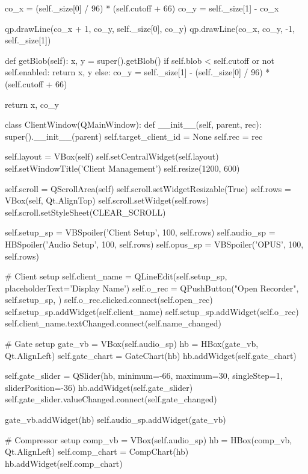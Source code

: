 \begin{pythoncode}
        co_x = (self._size[0] / 96) * (self.cutoff + 66)
        co_y = self._size[1] - co_x

        qp.drawLine(co_x + 1, co_y, self._size[0], co_y)
        qp.drawLine(co_x, co_y, -1, self._size[1])

    def getBlob(self):
        x, y = super().getBlob()
        if self.blob < self.cutoff or not self.enabled:
            return x, y
        else:
            co_y = self._size[1] - (self._size[0] / 96) * (self.cutoff + 66)

            return x, co_y


class ClientWindow(QMainWindow):
    def __init__(self, parent, rec):
        super().__init__(parent)
        self.target_client_id = None
        self.rec = rec

        self.layout = VBox(self)
        self.setCentralWidget(self.layout)
        self.setWindowTitle('Client Management')
        self.resize(1200, 600)

        self.scroll = QScrollArea(self)
        self.scroll.setWidgetResizable(True)
        self.rows = VBox(self, Qt.AlignTop)
        self.scroll.setWidget(self.rows)
        self.scroll.setStyleSheet(CLEAR_SCROLL)

        self.setup_sp = VBSpoiler('Client Setup', 100, self.rows)
        self.audio_sp = HBSpoiler('Audio Setup', 100, self.rows)
        self.opus_sp = VBSpoiler('OPUS', 100, self.rows)

        # Client setup
        self.client_name = QLineEdit(self.setup_sp, placeholderText='Display Name')
        self.o_rec = QPushButton("Open Recorder", self.setup_sp, )
        self.o_rec.clicked.connect(self.open_rec)
        self.setup_sp.addWidget(self.client_name)
        self.setup_sp.addWidget(self.o_rec)
        self.client_name.textChanged.connect(self.name_changed)

        # Gate setup
        gate_vb = VBox(self.audio_sp)
        hb = HBox(gate_vb, Qt.AlignLeft)
        self.gate_chart = GateChart(hb)
        hb.addWidget(self.gate_chart)

        self.gate_slider = QSlider(hb, minimum=-66, maximum=30, singleStep=1, sliderPosition=-36)
        hb.addWidget(self.gate_slider)
        self.gate_slider.valueChanged.connect(self.gate_changed)

        gate_vb.addWidget(hb)
        self.audio_sp.addWidget(gate_vb)

        # Compressor setup
        comp_vb = VBox(self.audio_sp)
        hb = HBox(comp_vb, Qt.AlignLeft)
        self.comp_chart = CompChart(hb)
        hb.addWidget(self.comp_chart)


\end{pythoncode}
